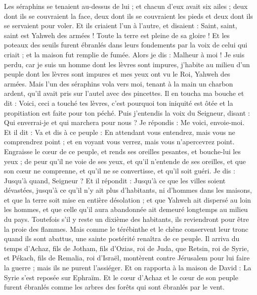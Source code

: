 \begin{multicols}{2}
Les séraphins se tenaient au-dessus de lui ; et chacun d'eux avait six ailes ; deux dont ils se couvraient la face, deux dont ils se couvraient les pieds et deux dont ils se servaient pour voler.
Et ils criaient l'un à l'autre, et disaient : Saint, saint, saint est Yahweh des armées ! Toute la terre est pleine de sa gloire !
Et les poteaux des seuils furent ébranlés dans leurs fondements par la voix de celui qui criait ; et la maison fut remplie de fumée.
Alors je dis : Malheur à moi ! Je suis perdu, car je suis un homme dont les lèvres sont impures, j'habite au milieu d'un peuple dont les lèvres sont impures et mes yeux ont vu le Roi, Yahweh des armées.
Mais l'un des séraphins vola vers moi, tenant à la main un charbon ardent, qu'il avait pris sur l'autel avec des pincettes.
Il en toucha ma bouche et dit : Voici, ceci a touché tes lèvres, c'est pourquoi ton iniquité est ôtée et la propitiation est faite pour ton péché.
Puis j'entendis la voix du Seigneur, disant : Qui enverrai-je et qui marchera pour nous ? Je répondis : Me voici, envoie-moi.
Et il dit : Va et dis à ce peuple : En attendant vous entendrez, mais vous ne comprendrez point ; et en voyant vous verrez, mais vous n'apercevrez point.
Engraisse le cœur de ce peuple, et rends ses oreilles pesantes, et bouche-lui les yeux ; de peur qu'il ne voie de ses yeux, et qu'il n'entende de ses oreilles, et que son cœur ne comprenne, et qu'il ne se convertisse, et qu'il soit guéri.
Je dis : Jusqu'à quand, Seigneur ? Et il répondit : Jusqu'à ce que les villes soient dévastées, jusqu'à ce qu'il n'y ait plus d'habitants, ni d'hommes dans les maisons, et que la terre soit mise en entière désolation ;
 et que Yahweh ait dispersé au loin les hommes, et que celle qu'il aura abandonnée ait demeuré longtemps au milieu du pays.
Toutefois s'il y reste un dixième des habitants, ils reviendront pour être la proie des flammes. Mais comme le térébinthe et le chêne conservent leur tronc quand ils sont abattus, une sainte postérité renaîtra de ce peuple.
\VerseOne{}Il arriva du temps d'Achaz, fils de Jotham, fils d'Ozias, roi de Juda, que Retsin, roi de Syrie, et Pékach, fils de Remalia, roi d'Israël, montèrent contre Jérusalem pour lui faire la guerre ; mais ils ne purent l'assiéger.
Et on rapporta à la maison de David : La Syrie s'est reposée sur Ephraïm. Et le cœur d'Achaz et le cœur de son peuple furent ébranlés comme les arbres des forêts qui sont ébranlés par le vent.

\end{multicols}

